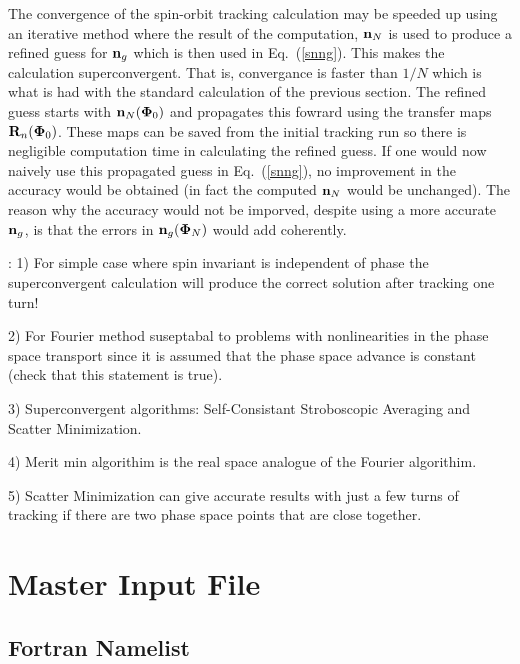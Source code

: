 \documentclass[11pt,openany]{report}
\newcommand{\Bf}[1]{{\bf #1}}
\newcommand{\bfn}{{\Bf n}}
\newcommand{\bfR}{{\Bf R}}
\newcommand{\bfPhi}{{\Bf \Phi}}
\newcommand{\Eq}[1]{{Eq.~(\protect\ref{#1})}}
\begin{document}
The convergence of the spin-orbit tracking calculation may be speeded up using an iterative method
where the result of the computation, $\bfn_N$ is used to produce a refined guess for $\bfn_g$ which
is then used in \Eq{snng}. This makes the calculation superconvergent. That is, convergance is
faster than $1/N$ which is what is had with the standard calculation of the previous section. The
refined guess starts with $\bfn_N(\bfPhi_0)$ and propagates this fowrard using the transfer maps
$\bfR_n(\bfPhi_0)$. These maps can be saved from the initial tracking run so there is negligible
computation time in calculating the refined guess. If one would now naively use this propagated
guess in \Eq{snng}, no improvement in the accuracy would be obtained (in fact the computed $\bfn_N$
would be unchanged). The reason why the accuracy would not be imporved, despite using a more
accurate $\bfn_g$, is that the errors in $\bfn_g(\bfPhi_N)$ would add coherently. 



\Notes:
1) For simple case where spin invariant is independent of phase the superconvergent calculation will produce the
correct solution after tracking one turn!

2) For Fourier method suseptabal to problems with nonlinearities in the phase space transport since it is assumed
that the phase space advance is constant (check that this statement is true).

3) Superconvergent algorithms: Self-Consistant Stroboscopic Averaging and Scatter Minimization.

4) Merit min algorithim is the real space analogue of the Fourier algorithim.

5) Scatter Minimization can give accurate results with just a few turns of tracking if there are two phase
space points that are close together.

\chapter{Master Input File} 
\label{s:master}

\section{Fortran Namelist}
\label{s:namelist}
\end{document}
